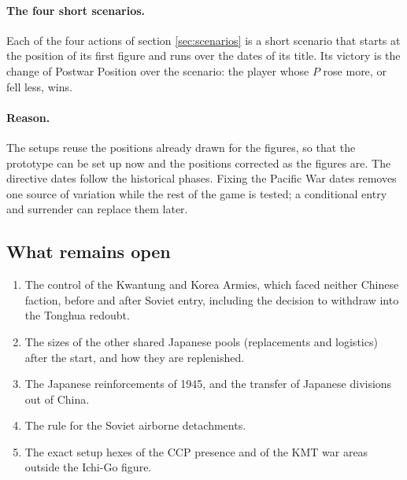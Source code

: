 \documentclass[11pt]{article}
\begin{document}
\paragraph{The four short scenarios.} Each of the four actions of section \ref{sec:scenarios} is a short scenario that starts at the position of its first figure and runs over the dates of its title. Its victory is the change of Postwar Position over the scenario: the player whose $P$ rose more, or fell less, wins.

\paragraph{Reason.} The setups reuse the positions already drawn for the figures, so that the prototype can be set up now and the positions corrected as the figures are. The directive dates follow the historical phases. Fixing the Pacific War dates removes one source of variation while the rest of the game is tested; a conditional entry and surrender can replace them later.

\subsection{What remains open}\label{app:remaining}
\begin{enumerate}
\item The control of the Kwantung and Korea Armies, which faced neither Chinese faction, before and after Soviet entry, including the decision to withdraw into the Tonghua redoubt.
\item The sizes of the other shared Japanese pools (replacements and logistics) after the start, and how they are replenished.
\item The Japanese reinforcements of 1945, and the transfer of Japanese divisions out of China.
\item The rule for the Soviet airborne detachments.
\item The exact setup hexes of the CCP presence and of the KMT war areas outside the Ichi-Go figure.
\end{enumerate}
\end{document}
